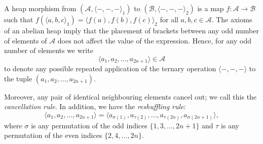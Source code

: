 \documentclass[14pt]{article}
\theoremstyle{Definition}
\theoremstyle{remark}
\begin{document}
A heap morphism from $(\mathcal{A},\langle -,-,- \rangle_{1})$ to $(\mathcal{B},\langle -,-,- \rangle_{2})$ is a map $f:\mathcal{A}\to \mathcal{B}$ such that $f(\langle a,b,c\rangle_{1})=\langle f(a),f(b),f(c)\rangle_{2}$ for all $a,b,c\in \mathcal{A}$.
The axioms of an abelian heap imply that the placement of brackets 
between any odd number of elements of $\mathcal{A}$ does not affect the value of the expression. 
Hence, for any odd number of elements we write
\[
  \langle a_1,a_2,\ldots,a_{2n+1}\rangle \in \mathcal{A}
\]
to denote any possible repeated application of the ternary operation $\langle-,-,-\rangle$ 
to the tuple $(a_1,a_2,\ldots,a_{2n+1})$.

\medskip

Moreover, any pair of identical neighbouring elements cancel out; we call this 
the \emph{cancellation rule}. In addition, we have the \emph{reshuffling rule}:
\[
  \langle a_1,a_2,\ldots,a_{2n+1}\rangle
  = \langle a_{\sigma(1)},a_{\tau(2)},\ldots,a_{\tau(2n)},a_{\sigma(2n+1)}\rangle,
\]
where $\sigma$ is any permutation of the odd indices 
$\{1,3,\ldots,2n+1\}$ and $\tau$ is any permutation of the even indices 
$\{2,4,\ldots,2n\}$. 

\medskip
\end{document}
